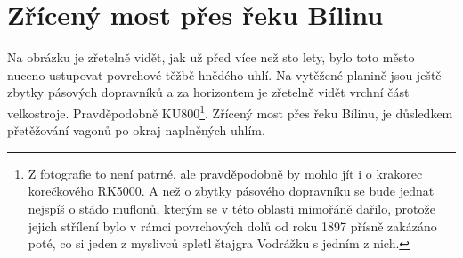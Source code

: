 
\chapter{Zřícený most přes řeku Bílinu}


Na obrázku je zřetelně vidět, jak už před více než sto lety, bylo toto město
nuceno ustupovat povrchové těžbě hnědého uhlí. Na vytěžené planině jsou ještě
zbytky pásových dopravníků a za horizontem je zřetelně vidět vrchní část
velkostroje. Pravděpodobně KU800\footnote{Z fotografie to není patrné, ale
pravděpodobně by mohlo jít i o krakorec korečkového RK5000. A než o zbytky
pásového dopravníku se bude jednat nejspíš o stádo muflonů, kterým se v této
oblasti mimořáně dařilo, protože jejich střílení bylo v rámci povrchových dolů
od roku 1897 přísně zakázáno poté, co si jeden z myslivců spletl štajgra
Vodrážku s jedním z nich.}. Zřícený most přes řeku Bílinu, je důsledkem
přetěžování vagonů po okraj naplněných uhlím.

